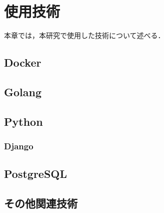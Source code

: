 \section{使用技術}\label{sec2}

本章では，本研究で使用した技術について述べる．

\subsection{Docker}
\subsection{Golang}
\subsection{Python}
\subsubsection{Django}
\subsection{PostgreSQL}
\subsection{その他関連技術}